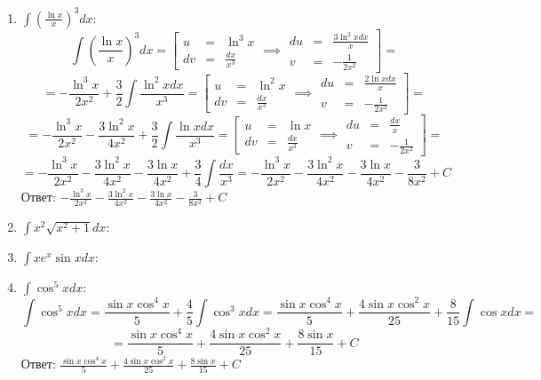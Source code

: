 \documentclass[a4paper,12pt]{article}
\begin{document}
\begin{enumerate}
    \item $\int\left(\frac{\ln x}{x}\right)^3 dx$:
    $$\int\left(\frac{\ln x}{x}\right)^3 dx = \left[\begin{array}{rcl}
        u & = & \ln^3 x \\
        dv & = & \frac{dx}{x^3}
    \end{array}\right. \implies \left.\begin{array}{rcl}
        du & = & \frac{3\ln^2 xdx}{x} \\
        v & = & -\frac{1}{2x^2}
    \end{array}\right] =$$
    $$= -\frac{\ln^3 x}{2x^2} + \frac{3}{2}\int\frac{\ln^2 x dx}{x^3} = \left[\begin{array}{rcl}
        u & = & \ln^2 x \\
        dv & = & \frac{dx}{x^3}
    \end{array}\right. \implies \left.\begin{array}{rcl}
        du & = & \frac{2\ln xdx}{x} \\
        v & = & -\frac{1}{2x^2}
    \end{array}\right] =$$
    $$= -\frac{\ln^3 x}{2x^2} - \frac{3\ln^2 x}{4x^2} + \frac{3}{2}\int\frac{\ln xdx}{x^3} = \left[\begin{array}{rcl}
        u & = & \ln x \\
        dv & = & \frac{dx}{x^3}
    \end{array}\right. \implies \left.\begin{array}{rcl}
        du & = & \frac{dx}{x} \\
        v & = & -\frac{1}{2x^2}
    \end{array}\right] =$$
    $$= -\frac{\ln^3 x}{2x^2} - \frac{3\ln^2 x}{4x^2} - \frac{3\ln x}{4 x^2} + \frac{3}{4}\int \frac{dx}{x^3} = -\frac{\ln^3 x}{2x^2} - \frac{3\ln^2 x}{4x^2} - \frac{3\ln x}{4 x^2} -\frac{3}{8x^2} + C$$
    Ответ: $-\frac{\ln^3 x}{2x^2} - \frac{3\ln^2 x}{4x^2} - \frac{3\ln x}{4 x^2} -\frac{3}{8x^2} + C$

    \item $\int x^2\sqrt{x^2 + 1}dx$:
    
    \item $\int xe^x\sin xdx$:
    
    \item $\int \cos^5 xdx$:
    $$\int \cos^5 xdx = \frac{\sin x\cos^4 x}{5} + \frac{4}{5}\int\cos^3 xdx = \frac{\sin x\cos^4 x}{5} + \frac{4\sin x\cos^2 x}{25} + \frac{8}{15}\int\cos xdx =$$
    $$= \frac{\sin x\cos^4 x}{5} + \frac{4\sin x\cos^2 x}{25} + \frac{8\sin x}{15} + C$$
    Ответ: $\frac{\sin x\cos^4 x}{5} + \frac{4\sin x\cos^2 x}{25} + \frac{8\sin x}{15} + C$


\end{enumerate}
\end{document}
